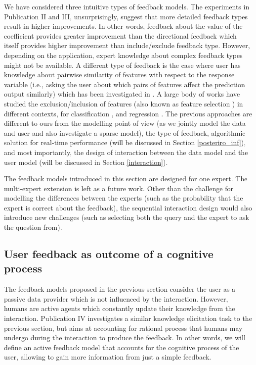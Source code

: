 \documentclass[dissertation,math,vertlayout,pdfa,colorlinks]{aaltoseries}
\begin{document}
We have considered three intuitive types of feedback models. The experiments in Publication II and III, unsurprisingly, suggest that more detailed feedback types result in higher improvements. In other words, feedback about the value of the coefficient provides greater improvement than the directional feedback which itself provides higher improvement than include/exclude feedback type. However, depending on the application, expert knowledge about complex feedback types might not be available. %
A different type of feedback is the case where user has knowledge about pairwise similarity of features with respect to the response variable (i.e., asking the user about which  pairs of features affect the prediction output similarly) which has been investigated in \cite{Homayun_pairwise_UMAP,Homayun_pairwise_ijcai2019}. A large body of works have studied the exclusion/inclusion of features (also known as feature selection \cite{Correia2019HumanintheLoopFS}) in different contexts, for classification  \cite{druck2009active,raghavan2006active,settles2011closing}, and regression \cite{Micallef_elicitation}. %
The previous approaches are different to ours from the modelling point of view (as we jointly model the data and user and also investigate a sparse model), the type of feedback, algorithmic solution for real-time performance (will be discussed in Section \ref{posteriro_inf}), and most importantly, the design of interaction between the data model and the user model (will be discussed in Section \ref{interaction}).

The feedback models introduced in this section are designed for one expert. The multi-expert extension is left as a future work. Other than the challenge for modelling the differences between the experts (such as the probability that the expert is correct about the feedback), the sequential interaction design would also introduce new challenges (such as selecting both the query and the expert to ask the question from).

\subsection{User feedback as outcome of a cognitive process}

The feedback models proposed in the previous section consider the user as a passive data provider which is not influenced by the interaction. However, humans are active agents which constantly update their knowledge from the interaction. Publication IV investigates a similar knowledge elicitation task to the previous section, but aims at accounting for rational process that humans may undergo during the interaction to produce the feedback. In other words, we will define an active feedback model that accounts for the cognitive process of the user, allowing to gain more information from just a simple feedback.
\end{document}
